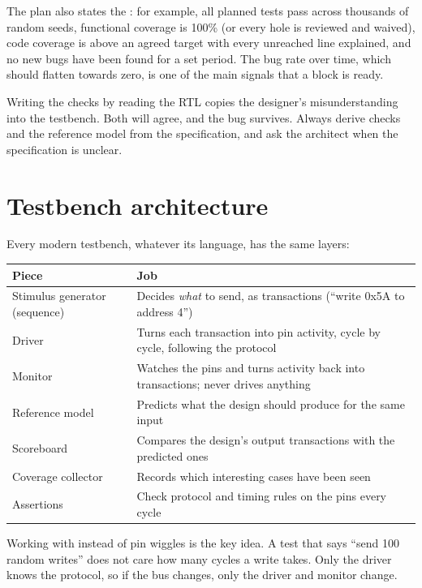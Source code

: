 The plan also states the : for example, all planned tests pass across thousands of random seeds, functional coverage is 100\% (or every hole is reviewed and waived), code coverage is above an agreed target with every unreached line explained, and no new bugs have been found for a set period. The bug rate over time, which should flatten towards zero, is one of the main signals that a block is ready.

\begin{trap}
Writing the checks by reading the RTL copies the designer's misunderstanding into the testbench. Both will agree, and the bug survives. Always derive checks and the reference model from the specification, and ask the architect when the specification is unclear.
\end{trap}

\section{Testbench architecture}

Every modern testbench, whatever its language, has the same layers:

\begin{center}
\begin{tabular}{ll}
\toprule
Piece & Job \\
\midrule
Stimulus generator (sequence) & Decides \emph{what} to send, as transactions (``write 0x5A to address 4'') \\
Driver & Turns each transaction into pin activity, cycle by cycle, following the protocol \\
Monitor & Watches the pins and turns activity back into transactions; never drives anything \\
Reference model & Predicts what the design should produce for the same input \\
Scoreboard & Compares the design's output transactions with the predicted ones \\
Coverage collector & Records which interesting cases have been seen \\
Assertions & Check protocol and timing rules on the pins every cycle \\
\bottomrule
\end{tabular}
\end{center}

Working with  instead of pin wiggles is the key idea. A test that says ``send 100 random writes'' does not care how many cycles a write takes. Only the driver knows the protocol, so if the bus changes, only the driver and monitor change.


